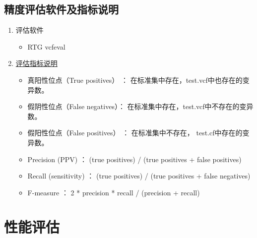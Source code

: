 \documentclass[UTF8,10pt,a4paper]{ctexart}
\begin{document}
\subsection{精度评估软件及指标说明}
\begin{enumerate}
\item 评估软件
\begin{itemize}
\item RTG vcfeval
\end{itemize}
\item \href{https://note.youdao.com/share/?token=170F71A3F2494D089B29E2AD944A6ECA&gid=12269890}{评估指标说明}
\begin{itemize}
\item 真阳性位点（True positives）  ：  在标准集中存在，test.vcf中也存在的变异数。 
\item 假阴性位点（False negatives）：  在标准集中存在，test.vcf中不存在的变异数。
\item 假阳性位点（False positives） ：  在标准集中不存在， test.cf中存在的变异数。
\item Precision (PPV) 		： (true positives) / (true positives + false positives) 
\item Recall (sensitivity)		： (true positives) / (true positives + false negatives) 
\item F-measure			： 2 * precision * recall / (precision + recall)
\end{itemize}
\end{enumerate}


\section{性能评估}
\end{document}
